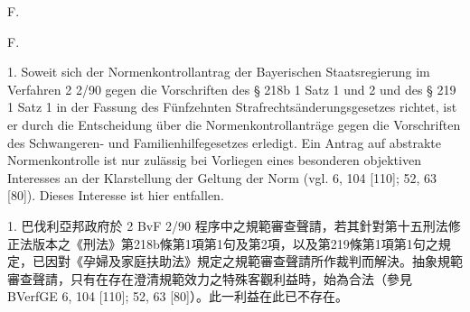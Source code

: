 \documentclass[12pt]{article}
\begin{document}
\bikeepwithnext[6]
\begin{sourcepara}[title={原文E.258}]
F.
\end{sourcepara}
\begin{transpara}
F.
\end{transpara}

\begin{sourcepara}[title={原文E.259}]
1. Soweit sich der Normenkontrollantrag der Bayerischen Staatsregierung im Verfahren 2 \abbrBvF{} 2/90 gegen die Vorschriften des § 218b \abbrAbs{} 1 Satz 1 und \abbrAbs{} 2 und des § 219 \abbrAbs{} 1 Satz 1 \abbrStGB{} in der Fassung des Fünfzehnten Strafrechtsänderungsgesetzes richtet, ist er durch die Entscheidung über die Normenkontrollanträge gegen die Vorschriften des Schwangeren- und Familienhilfegesetzes erledigt. Ein Antrag auf abstrakte Normenkontrolle ist nur zulässig bei Vorliegen eines besonderen objektiven Interesses an der Klarstellung der Geltung der Norm (vgl. \abbrBVerfGE{} 6, 104 [110]; 52, 63 [80]). Dieses Interesse ist hier entfallen.
\end{sourcepara}
\begin{transpara}
1. 巴伐利亞邦政府於 2 BvF 2/90 程序中之規範審查聲請，若其針對第十五刑法修正法版本之《刑法》第218b條第1項第1句及第2項，以及第219條第1項第1句之規定，已因對《孕婦及家庭扶助法》規定之規範審查聲請所作裁判而解決。抽象規範審查聲請，只有在存在澄清規範效力之特殊客觀利益時，始為合法（參見 BVerfGE 6, 104 [110]; 52, 63 [80]）。此一利益在此已不存在。
\end{transpara}
\end{document}
